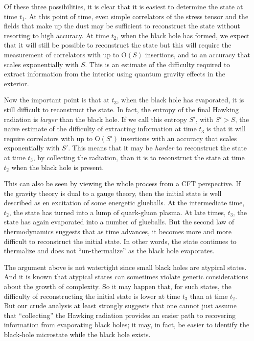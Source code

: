 \documentclass[12pt]{article}
\def\Or[#1]{{\text{O}}\left({#1}\right)}
\begin{document}
Of these three possibilities, it is clear that it is easiest to determine the state at time $t_1$. At this point of time, even simple correlators of the stress tensor and the fields that make up the dust may be sufficient to reconstruct the state without resorting to high accuracy. At time $t_2$, when the black hole has formed, we expect that it will still be possible to reconstruct the state but this will require the measurement of correlators with up to $\Or[S]$ insertions, and to an accuracy that scales exponentially with $S$.  This is an estimate of the difficulty required to extract information from the interior using quantum gravity effects in the exterior.

Now the important point is that at $t_3$, when the black hole has evaporated, it is still difficult to reconstruct the state. In fact, the entropy of the final Hawking radiation is {\em larger} than the black hole. If we call this entropy $S'$, with $S' > S$, the naive estimate of the difficulty of extracting information at time $t_3$ is that it will require correlators with up to $\Or[S']$ insertions with an accuracy that scales exponentially with $S'$. This means that it may be {\em harder} to reconstruct the state at time $t_3$, by collecting the radiation, than it is to reconstruct the state at time $t_2$ when the black hole is present.

This can also be seen by viewing the whole process from a CFT perspective. If the gravity theory is dual to a gauge theory, then the initial state is well described as en excitation of some energetic glueballs. At the intermediate time, $t_2$, the state has turned into a lump of quark-gluon plasma. At late times, $t_3$, the state has again evaporated into a number of glueballs.  But the second law of thermodynamics suggests that as time advances, it becomes more and more difficult to reconstruct the initial state. In other words, the state continues to thermalize and does not ``un-thermalize'' as the black hole evaporates.


The argument above is not watertight since small black holes are atypical states. And it is known that atypical states can sometimes violate generic considerations about the growth of complexity. So it may happen that, for such states, the  difficulty of reconstructing the initial state is lower at time $t_3$ than at time $t_2$. But our crude analysis at least strongly suggests that one cannot just assume that ``collecting'' the Hawking radiation provides an easier path to recovering information from evaporating black holes; it may, in fact, be easier to identify the black-hole microstate while the black hole exists.
\end{document}

